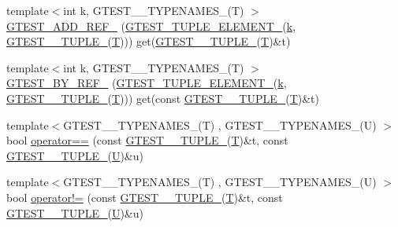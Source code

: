 \begin{DoxyCompactItemize}
\item 
{\footnotesize template$<$int k, G\-T\-E\-S\-T\-\_\-\_\-\-T\-Y\-P\-E\-N\-A\-M\-E\-S\-\_\-(\-T) $>$ }\\\hyperlink{namespacestd_1_1tr1_ad0769041710d18b917067576f84b0303}{G\-T\-E\-S\-T\-\_\-\-A\-D\-D\-\_\-\-R\-E\-F\-\_\-} (\hyperlink{ts__gtest_8h_a1b7f133d8aa02e0b7afed7b66781eeb7}{G\-T\-E\-S\-T\-\_\-\-T\-U\-P\-L\-E\-\_\-\-E\-L\-E\-M\-E\-N\-T\-\_\-}(\hyperlink{legacy_8hpp_a7be9b6436e5ea72ff5d5a66779b4bd38}{k}, \hyperlink{namespacestd_1_1tr1_aa636d3269bf1f368a7bc09ff158bc482}{G\-T\-E\-S\-T\-\_\-\_\-\-T\-U\-P\-L\-E\-\_\-}(\hyperlink{calib3d_8hpp_a3efb9551a871ddd0463079a808916717}{T}))) get(\hyperlink{namespacestd_1_1tr1_aa636d3269bf1f368a7bc09ff158bc482}{G\-T\-E\-S\-T\-\_\-\_\-\-T\-U\-P\-L\-E\-\_\-}(\hyperlink{calib3d_8hpp_a3efb9551a871ddd0463079a808916717}{T})\&t)
\item 
{\footnotesize template$<$int k, G\-T\-E\-S\-T\-\_\-\_\-\-T\-Y\-P\-E\-N\-A\-M\-E\-S\-\_\-(\-T) $>$ }\\\hyperlink{namespacestd_1_1tr1_a7c131d0c2462612a78012be16114f61d}{G\-T\-E\-S\-T\-\_\-\-B\-Y\-\_\-\-R\-E\-F\-\_\-} (\hyperlink{ts__gtest_8h_a1b7f133d8aa02e0b7afed7b66781eeb7}{G\-T\-E\-S\-T\-\_\-\-T\-U\-P\-L\-E\-\_\-\-E\-L\-E\-M\-E\-N\-T\-\_\-}(\hyperlink{legacy_8hpp_a7be9b6436e5ea72ff5d5a66779b4bd38}{k}, \hyperlink{namespacestd_1_1tr1_aa636d3269bf1f368a7bc09ff158bc482}{G\-T\-E\-S\-T\-\_\-\_\-\-T\-U\-P\-L\-E\-\_\-}(\hyperlink{calib3d_8hpp_a3efb9551a871ddd0463079a808916717}{T}))) get(const \hyperlink{namespacestd_1_1tr1_aa636d3269bf1f368a7bc09ff158bc482}{G\-T\-E\-S\-T\-\_\-\_\-\-T\-U\-P\-L\-E\-\_\-}(\hyperlink{calib3d_8hpp_a3efb9551a871ddd0463079a808916717}{T})\&t)
\item 
{\footnotesize template$<$G\-T\-E\-S\-T\-\_\-\_\-\-T\-Y\-P\-E\-N\-A\-M\-E\-S\-\_\-(\-T) , G\-T\-E\-S\-T\-\_\-\_\-\-T\-Y\-P\-E\-N\-A\-M\-E\-S\-\_\-(\-U) $>$ }\\bool \hyperlink{namespacestd_1_1tr1_af4516de784404381f9b14797694b6311}{operator==} (const \hyperlink{namespacestd_1_1tr1_aa636d3269bf1f368a7bc09ff158bc482}{G\-T\-E\-S\-T\-\_\-\_\-\-T\-U\-P\-L\-E\-\_\-}(\hyperlink{calib3d_8hpp_a3efb9551a871ddd0463079a808916717}{T})\&t, const \hyperlink{namespacestd_1_1tr1_aa636d3269bf1f368a7bc09ff158bc482}{G\-T\-E\-S\-T\-\_\-\_\-\-T\-U\-P\-L\-E\-\_\-}(\hyperlink{core__c_8h_aa9c521f41af9a5191e5e4b6ffbae211a}{U})\&u)
\item 
{\footnotesize template$<$G\-T\-E\-S\-T\-\_\-\_\-\-T\-Y\-P\-E\-N\-A\-M\-E\-S\-\_\-(\-T) , G\-T\-E\-S\-T\-\_\-\_\-\-T\-Y\-P\-E\-N\-A\-M\-E\-S\-\_\-(\-U) $>$ }\\bool \hyperlink{namespacestd_1_1tr1_a058882c51de469b5e78d29076f864940}{operator!=} (const \hyperlink{namespacestd_1_1tr1_aa636d3269bf1f368a7bc09ff158bc482}{G\-T\-E\-S\-T\-\_\-\_\-\-T\-U\-P\-L\-E\-\_\-}(\hyperlink{calib3d_8hpp_a3efb9551a871ddd0463079a808916717}{T})\&t, const \hyperlink{namespacestd_1_1tr1_aa636d3269bf1f368a7bc09ff158bc482}{G\-T\-E\-S\-T\-\_\-\_\-\-T\-U\-P\-L\-E\-\_\-}(\hyperlink{core__c_8h_aa9c521f41af9a5191e5e4b6ffbae211a}{U})\&u)
\end{DoxyCompactItemize}
